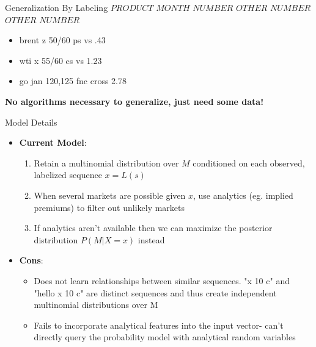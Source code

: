 \documentclass{beamer}
\begin{document}
\begin{frame}{Generalization By Labeling}
$PRODUCT$ $MONTH$ $NUMBER$ $OTHER$ $NUMBER$ $OTHER$ $NUMBER$\newline
\begin{itemize}
\pause
\item brent z 50/60 ps vs .43
\item wti x 55/60 cs vs 1.23
\item go jan 120,125 fnc cross 2.78\newline\newline
\pause
\end{itemize}
\textbf{No algorithms necessary to generalize, just need some data!}
\end{frame}

\begin{frame}{Model Details}

\begin{itemize}
\item \textbf{Current Model}:
\begin{enumerate}
 \item Retain a multinomial distribution over $M$ conditioned on each observed, labelized sequence $x = L(s)$
 \item When several markets are possible given $x$, use analytics (eg. implied premiums) to filter out unlikely markets
 \item If analytics aren't available then we can maximize the posterior distribution $P(M|X=x)$ instead
\end{enumerate}
\pause
\item \textbf{Cons}:
\begin{itemize}
\item Does not learn relationships between similar sequences. "x 10 c" and "hello x 10 c" are distinct sequences and thus create independent multinomial distributions over M
\item Fails to incorporate analytical features into the input vector- can't directly query the probability model with analytical random variables
\end{itemize}
\end{itemize}
\end{frame}
\end{document}
